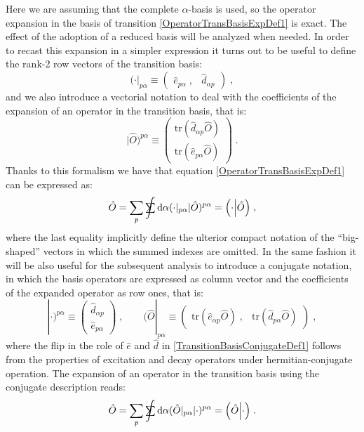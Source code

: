 \documentclass[a4paper]{article}
\newcommand{\dd}{{\rm d}}
\newcommand{\sint}{\mathrlap{\displaystyle\int}
\mathrlap{\textstyle\sum}
\phantom{\mathrlap{\displaystyle
\int}\textstyle\sum}}
\newcommand{\be}{\begin{equation}}
\newcommand{\ee}{\end{equation}}
\newcommand{\qq}{\qquad}
\newcommand{\lb}{\label}
\newcommand{\mat}[1]{\begin{pmatrix} #1\end{pmatrix}}
\newcommand{\op}[1]{\hat {#1}}
\newcommand{\trace}[1]{\mathrm{tr}\left(#1\right)}
\newcommand{\sket}[2]{| #2)^{#1}}
\newcommand{\sbra}[2]{( #2|_{#1}}
\newcommand{\dbraket}[2]{\Bigl(#1 \Bigl| #2 \Bigr)}
\newcommand{\excite}[2]{\op e_{{#1}{#2}}}
\newcommand{\decay}[2]{\op d_{{#1}{#2}}}
\begin{document}
Here we are assuming that the complete $\alpha$-basis is used, so the operator expansion in the basis of transition \eqref{OperatorTransBasisExpDef1} is exact. The effect of
the adoption of a reduced basis will be analyzed when needed. 
In order to recast this expansion in a simpler expression it turns out to be useful to define the rank-2 row vectors of the transition basis: 
\be
\sbra{p\alpha}{\cdot} \equiv 
\mat{ \excite{p}{\alpha} \;, & \decay{\alpha}{p} }\;,
\ee
and we also introduce a vectorial notation to deal with the coefficients of the expansion of an operator in the transition basis, that is: 
\be\lb{OperatorTransitionCoeffDef1}
\sket{p\alpha}{\op O}  \equiv \mat{ \trace{\decay{\alpha}{p}\op O } \\ 
\trace{\excite{p}{\alpha}\op O}} \; .
\ee
Thanks to this formalism we have that equation \eqref{OperatorTransBasisExpDef1} can be expressed as:
\be\lb{OperatorTransBasisExpDef2}
\op O = \sum_p\sint \dd \alpha \sbra{p\alpha}{\cdot}\sket{p\alpha}{\op O} = 
\dbraket{\cdot}{\op O} \;,
\ee
where the last equality implicitly define the ulterior compact notation of the ``big-shaped'' vectors in which the summed indexes are omitted.  
In the same fashion it will be also useful for the subsequent analysis to introduce a conjugate notation, in which the basis operators are expressed
as column vector and the coefficients of the expanded operator as row ones, that is: 
\be\lb{TransitionBasisConjugateDef1}
\sket{p\alpha}{\cdot} \equiv 
\mat{\decay{\alpha}{p} \\  \excite{p}{\alpha}} \;, \qq
\sbra{p\alpha}{\op O}  \equiv 
\mat{ \trace{\excite{\alpha}{p}\op O } \;, & \trace{\decay{p}{\alpha}\op O} }
\;,
\ee
where the flip in the role of $\op e$ and $\op d$ in \eqref{TransitionBasisConjugateDef1} follows from the properties of excitation and decay operators
under hermitian-conjugate operation. The expansion of an operator in the transition basis using the conjugate description reads: 
\be\lb{OperatorTransBasisConjugateExpDef1}
\op O = \sum_p\sint \dd \alpha \sbra{p\alpha}{\op O}\sket{p\alpha}{\cdot} = 
\dbraket{\op O}{\cdot} \;.
\ee
\end{document}
